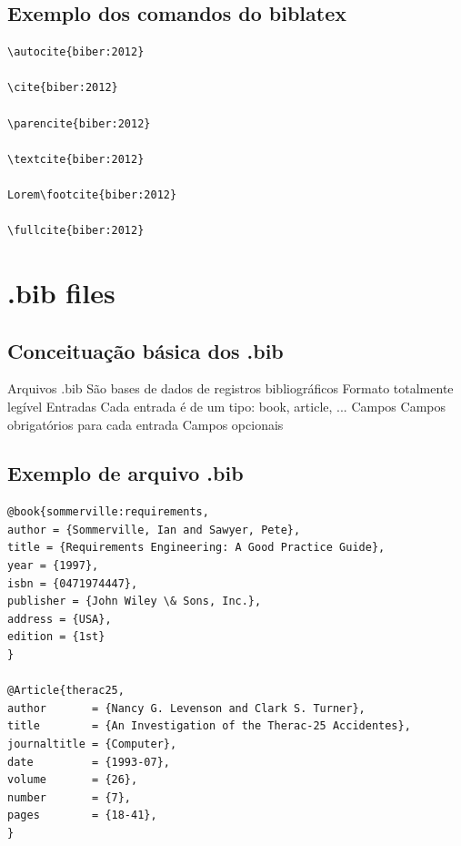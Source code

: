 \subsection{Exemplo dos comandos do biblatex}
\begin{lstlisting}[caption={Exemplo dos comandos do biblatex},
label=com:biblatex]
\autocite{biber:2012}

\cite{biber:2012}

\parencite{biber:2012}

\textcite{biber:2012}

Lorem\footcite{biber:2012}

\fullcite{biber:2012}
\end{lstlisting}



\section{.bib files}

\subsection{Conceituação básica dos .bib}

\begin{outline}
    \1 Arquivos .bib
    \2 São bases de dados de registros bibliográficos
    \2 Formato totalmente legível
    \1 Entradas 
    \2 Cada entrada é de um tipo: book, article, ...
    \1 Campos
    \2 Campos obrigatórios para cada entrada
    \2 Campos opcionais
\end{outline}

\subsection{Exemplo de arquivo .bib}
\begin{verbatim}
@book{sommerville:requirements,
author = {Sommerville, Ian and Sawyer, Pete},
title = {Requirements Engineering: A Good Practice Guide},
year = {1997},
isbn = {0471974447},
publisher = {John Wiley \& Sons, Inc.},
address = {USA},
edition = {1st}
}

@Article{therac25,
author       = {Nancy G. Levenson and Clark S. Turner},
title        = {An Investigation of the Therac-25 Accidentes},
journaltitle = {Computer},
date         = {1993-07},
volume       = {26},
number       = {7},
pages        = {18-41},
}
\end{verbatim}

